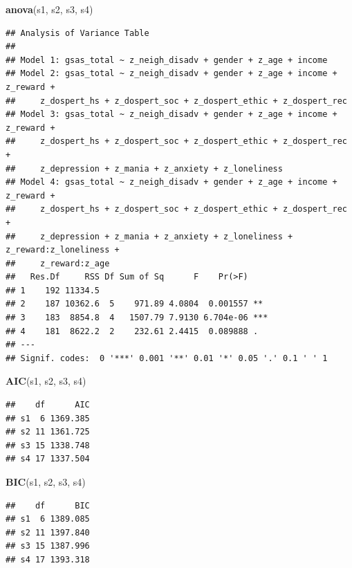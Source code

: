 \documentclass[
]{article}
\newenvironment{Shaded}{\begin{snugshade}}{\end{snugshade}}
\newcommand{\FunctionTok}[1]{\textcolor[rgb]{0.13,0.29,0.53}{\textbf{#1}}}
\newcommand{\NormalTok}[1]{#1}
\begin{document}
\begin{Shaded}
\begin{Highlighting}[]
\FunctionTok{anova}\NormalTok{(s1, s2, s3, s4)}
\end{Highlighting}
\end{Shaded}

\begin{verbatim}
## Analysis of Variance Table
## 
## Model 1: gsas_total ~ z_neigh_disadv + gender + z_age + income
## Model 2: gsas_total ~ z_neigh_disadv + gender + z_age + income + z_reward + 
##     z_dospert_hs + z_dospert_soc + z_dospert_ethic + z_dospert_rec
## Model 3: gsas_total ~ z_neigh_disadv + gender + z_age + income + z_reward + 
##     z_dospert_hs + z_dospert_soc + z_dospert_ethic + z_dospert_rec + 
##     z_depression + z_mania + z_anxiety + z_loneliness
## Model 4: gsas_total ~ z_neigh_disadv + gender + z_age + income + z_reward + 
##     z_dospert_hs + z_dospert_soc + z_dospert_ethic + z_dospert_rec + 
##     z_depression + z_mania + z_anxiety + z_loneliness + z_reward:z_loneliness + 
##     z_reward:z_age
##   Res.Df     RSS Df Sum of Sq      F    Pr(>F)    
## 1    192 11334.5                                  
## 2    187 10362.6  5    971.89 4.0804  0.001557 ** 
## 3    183  8854.8  4   1507.79 7.9130 6.704e-06 ***
## 4    181  8622.2  2    232.61 2.4415  0.089888 .  
## ---
## Signif. codes:  0 '***' 0.001 '**' 0.01 '*' 0.05 '.' 0.1 ' ' 1
\end{verbatim}

\begin{Shaded}
\begin{Highlighting}[]
\FunctionTok{AIC}\NormalTok{(s1, s2, s3, s4)}
\end{Highlighting}
\end{Shaded}

\begin{verbatim}
##    df      AIC
## s1  6 1369.385
## s2 11 1361.725
## s3 15 1338.748
## s4 17 1337.504
\end{verbatim}

\begin{Shaded}
\begin{Highlighting}[]
\FunctionTok{BIC}\NormalTok{(s1, s2, s3, s4)}
\end{Highlighting}
\end{Shaded}

\begin{verbatim}
##    df      BIC
## s1  6 1389.085
## s2 11 1397.840
## s3 15 1387.996
## s4 17 1393.318
\end{verbatim}
\end{document}
